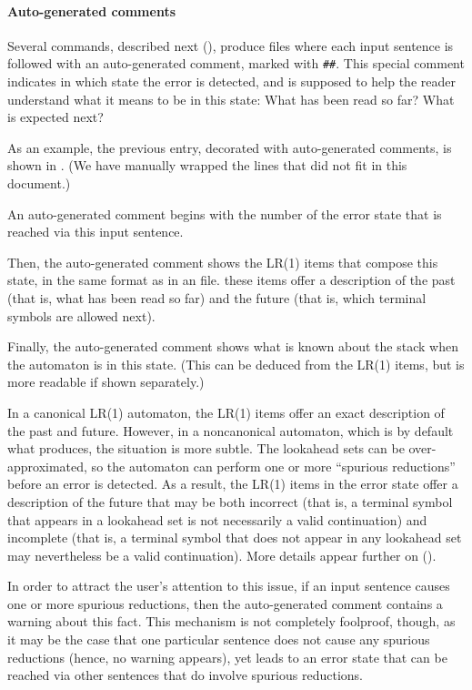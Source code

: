 \documentclass[onecolumn,11pt,nocopyrightspace,preprint]{sigplanconf}
\begin{document}
\paragraph{Auto-generated comments}

Several commands, described next (),
produce \messages files where each input sentence is followed with an
auto-generated comment, marked with \verb+##+. This special comment indicates
in which state the error is detected, and is supposed to help the reader
understand what it means to be in this state: What has been read so far? What
is expected next?

As an example, the previous entry, decorated with auto-generated comments, is
shown in . (We have manually wrapped the
lines that did not fit in this document.)

An auto-generated comment begins with the number of the error state that is
reached via this input sentence.

Then, the auto-generated comment shows the LR(1) items that compose this
state, in the same format as in an \automaton file. these items offer a
description of the past (that is, what has been read so far) and the future
(that is, which terminal symbols are allowed next).

Finally, the auto-generated comment shows what is known about the stack when
the automaton is in this state. (This can be deduced from the LR(1) items, but
is more readable if shown separately.)

In a canonical LR(1) automaton, the LR(1) items offer an exact description of
the past and future. However, in a noncanonical automaton, which is by default
what \menhir produces, the situation is more subtle. The lookahead sets can be
over-approximated, so the automaton can perform one or more ``spurious
reductions'' before an error is detected. As a result, the LR(1) items in the
error state offer a description of the future that may be both incorrect (that
is, a terminal symbol that appears in a lookahead set is not necessarily a
valid continuation) and incomplete (that is, a terminal symbol that does not
appear in any lookahead set may nevertheless be a valid continuation). More
details appear further on ().

In order to attract the user's attention to this issue, if an input sentence
causes one or more spurious reductions, then the auto-generated comment
contains a warning about this fact. This mechanism is not completely
foolproof, though, as it may be the case that one particular sentence does not
cause any spurious reductions (hence, no warning appears), yet leads to an
error state that can be reached via other sentences that do involve spurious
reductions.
\end{document}
